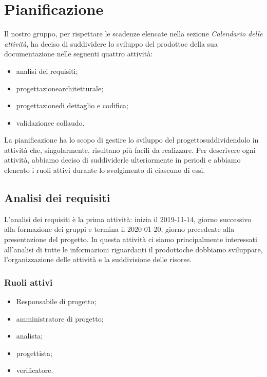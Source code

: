\section{Pianificazione} 
Il nostro gruppo, per rispettare le scadenze elencate nella sezione \textit{Calendario delle attività}, ha deciso di suddividere lo sviluppo del prodotto\glosp e della sua documentazione nelle seguenti quattro attività:
\begin{itemize}
	\item analisi dei requisiti;
	\item progettazione\glosp architetturale;
	\item progettazione\glosp di dettaglio e codifica;
	\item validazione\glosp e collaudo.
\end{itemize}
La pianificazione ha lo scopo di gestire lo sviluppo del progetto\glosp suddividendolo in attività che, singolarmente, risultano più facili da realizzare. Per descrivere ogni attività, abbiamo deciso di suddividerle ulteriormente in periodi e abbiamo elencato i ruoli attivi durante lo svolgimento di ciascuno di essi.

\subsection{Analisi dei requisiti}
L'analisi dei requisiti è la prima attività: inizia il 2019-11-14, giorno successivo alla formazione dei gruppi e termina il 2020-01-20, giorno precedente alla presentazione del progetto\glo. In questa attività ci siamo principalmente interessati all'analisi di tutte le informazioni riguardanti il prodotto\glosp che dobbiamo sviluppare, l'organizzazione delle attività e la suddivisione delle risorse.

\subsubsection{Ruoli attivi}
\begin{itemize}
	\item Responsabile di progetto\glo;
	\item amministratore di progetto\glo;
	\item analista;
	\item progettista;
	\item verificatore.
\end{itemize}

